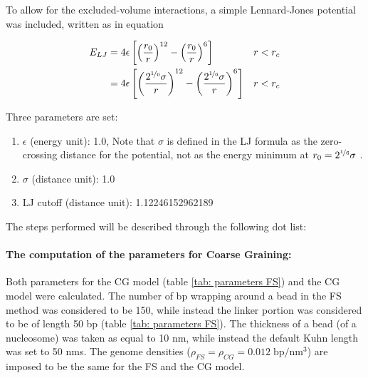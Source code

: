 To allow for the excluded-volume interactions, a simple Lennard-Jones potential was included, written as in equation

\begin{align} \label{eq: lennard jones potential}
    E_{LJ} &= 4 \epsilon \left[\left(\frac{r_0}{r}\right)^{12} - \left(\frac{r_0}{r}\right)^6\right]&& r < r_c \nonumber\\
           &= 4 \epsilon \left[\left(\frac{2^{\nicefrac{1}{6}}\sigma}{r}\right)^{12} - \left(\frac{2^{\nicefrac{1}{6}}\sigma}{r}\right)^6\right]&& r < r_c 
\end{align}


Three parameters are set:

\begin{enumerate} %
    \item $\epsilon$ (energy unit): 1.0, Note that $\sigma$ is defined in the LJ formula as the zero-crossing distance for the potential, not as the energy minimum at $r_0 = 2^{\nicefrac{1}{6}} \sigma$ .
    \item $\sigma$ (distance unit): 1.0
    \item LJ cutoff (distance unit): 1.12246152962189

\end{enumerate}

The steps performed will be described through the following dot list:


\paragraph{The computation of the parameters for Coarse Graining:}

Both parameters for the CG model (table \ref{tab: parameters FS}) and the CG model were calculated. The number of bp wrapping around a bead in the FS method was considered to be 150, while instead the linker portion was considered to be of length 50 bp (table \ref{tab: parameters FS}). The thickness of a bead (of a nucleosome) was taken as equal to 10 nm, while instead the default Kuhn length was set to 50 nms. The genome densities ($\rho_{FS} = \rho_{CG} = 0.012\; \text{bp}/\text{nm}^3$) are imposed to be the same for the FS and the CG model.

